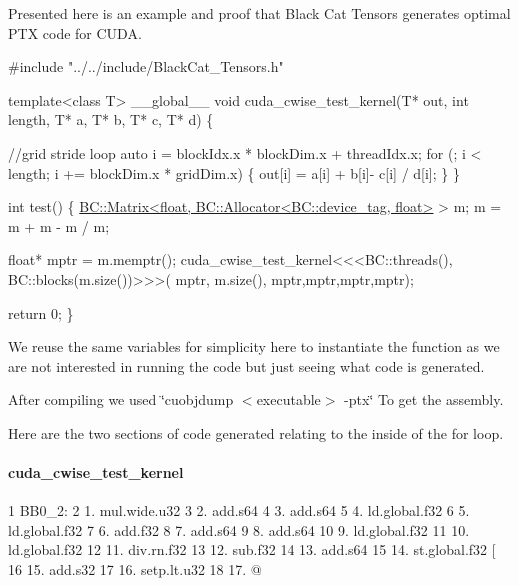 Presented here is an example and proof that Black Cat Tensors generates optimal P\+TX code for C\+U\+DA.


\begin{DoxyCode}
\textcolor{preprocessor}{#include "../../include/BlackCat\_Tensors.h"}

\textcolor{keyword}{template}<\textcolor{keyword}{class} T> \_\_global\_\_
\textcolor{keywordtype}{void} cuda\_cwise\_test\_kernel(T* out, \textcolor{keywordtype}{int} length, T* a, T* b, T* c, T* d) \{

        \textcolor{comment}{//grid stride loop}
        \textcolor{keyword}{auto} i = blockIdx.x * blockDim.x + threadIdx.x;
        \textcolor{keywordflow}{for} (; i < length; i += blockDim.x * gridDim.x) \{
            out[i] = a[i] + b[i]- c[i] / d[i];
        \}
\}


\textcolor{keywordtype}{int} test() \{
    \hyperlink{classBC_1_1tensors_1_1Tensor__Base}{BC::Matrix<float, BC::Allocator<BC::device\_tag, float>}
      > m;
    m = m + m - m / m;

    \textcolor{keywordtype}{float}* mptr = m.memptr();
    cuda\_cwise\_test\_kernel<<<BC::threads(), BC::blocks(m.size())>>>(
            mptr, m.size(),
            mptr,mptr,mptr,mptr);

    \textcolor{keywordflow}{return} 0;
\}
\end{DoxyCode}


We reuse the same variables for simplicity here to instantiate the function as we are not interested in running the code but just seeing what code is generated.

After compiling we used \char`\"{}cuobjdump $<$executable$>$ -\/ptx\char`\"{} To get the assembly.

Here are the two sections of code generated relating to the inside of the for loop.

\paragraph*{cuda\+\_\+cwise\+\_\+test\+\_\+kernel}


\begin{DoxyCode}
1 BB0\_2:
2 1.  mul.wide.u32 %
3 2.  add.s64 %
4 3.  add.s64 %
5 4.  ld.global.f32 %
6 5.  ld.global.f32 %
7 6.  add.f32 %
8 7.  add.s64 %
9 8.  add.s64 %
10 9.  ld.global.f32 %
11 10. ld.global.f32 %
12 11. div.rn.f32 %
13 12. sub.f32 %
14 13. add.s64 %
15 14. st.global.f32 [%
16 15. add.s32 %
17 16. setp.lt.u32 %
18 17. @%
\end{DoxyCode}


